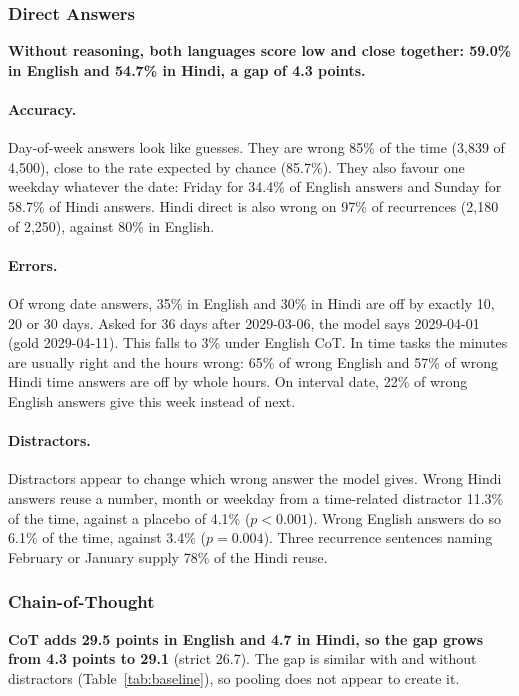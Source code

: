 \documentclass[11pt]{article}
\begin{document}
\subsubsection{Direct Answers}
\label{sec:direct}

\textbf{Without reasoning, both languages score low and close together: 59.0\% in English and 54.7\% in Hindi, a gap of 4.3 points.}

\paragraph{Accuracy.}
Day-of-week answers look like guesses. They are wrong 85\% of the time (3,839 of 4,500), close to the rate expected by chance (85.7\%). They also favour one weekday whatever the date: Friday for 34.4\% of English answers and Sunday for 58.7\% of Hindi answers. Hindi direct is also wrong on 97\% of recurrences (2,180 of 2,250), against 80\% in English.

\paragraph{Errors.}
Of wrong date answers, 35\% in English and 30\% in Hindi are off by exactly 10, 20 or 30 days. Asked for 36 days after 2029-03-06, the model says 2029-04-01 (gold 2029-04-11). This falls to 3\% under English CoT. In time tasks the minutes are usually right and the hours wrong: 65\% of wrong English and 57\% of wrong Hindi time answers are off by whole hours. On interval date, 22\% of wrong English answers give this week instead of next.

\paragraph{Distractors.}
Distractors appear to change which wrong answer the model gives. Wrong Hindi answers reuse a number, month or weekday from a time-related distractor 11.3\% of the time, against a placebo of 4.1\% ($p<0.001$). Wrong English answers do so 6.1\% of the time, against 3.4\% ($p=0.004$). Three recurrence sentences naming February or January supply 78\% of the Hindi reuse.

\subsubsection{Chain-of-Thought}
\label{sec:cot}

\textbf{CoT adds 29.5 points in English and 4.7 in Hindi, so the gap grows from 4.3 points to 29.1} (strict 26.7). The gap is similar with and without distractors (Table~\ref{tab:baseline}), so pooling does not appear to create it.
\end{document}
